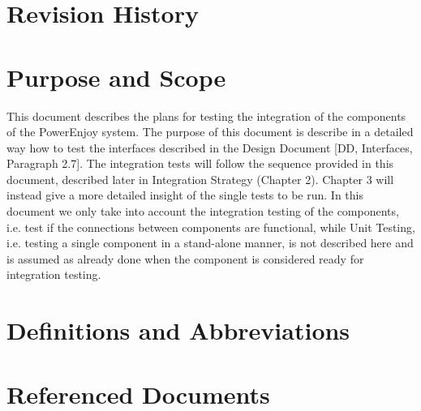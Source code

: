 \section{Revision History}

\section{Purpose and Scope}
This document describes the plans for testing the integration of the components of the PowerEnjoy system. The purpose of this document is describe in a detailed way how to test the interfaces described in the Design Document [DD, Interfaces, Paragraph 2.7]. The integration tests will follow the sequence provided in this document, described later in Integration Strategy (Chapter 2). Chapter 3 will instead give a more detailed insight of the single tests to be run.
\newline
In this document we only take into account the integration testing of the components, i.e. test if the connections between components are functional, while Unit Testing, i.e. testing a single component in a stand-alone manner, is not described here and is assumed as already done when the component is considered ready for integration testing.

\section{Definitions and Abbreviations}
\section{Referenced Documents}





